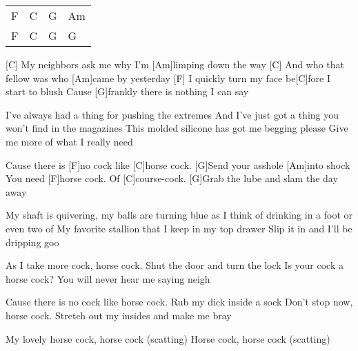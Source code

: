 

\begin{guitar}
	{\footnotesize\begin{tabular}{l|l|l|l}
			F & C & G & Am \\
			F & C & G & G 
	\end{tabular}}
	
	[C] My neighbors ask me why I'm [Am]limping down the way
	[C] And who that fellow was who [Am]came by yesterday
	[F] I quickly turn my face be[C]fore I start to blush
	Cause [G]frankly there is nothing I can say
	
	I've always had a thing for pushing the extremes
	And I've just got a thing you won't find in the magazines
	This molded silicone has got me begging please
	Give me more of what I really need
	
	Cause there is [F]no cock like [C]horse cock. [G]Send your asshole [Am]into shock
	You need [F]horse cock. Of [C]course-cock. [G]Grab the lube and slam the day away
	
	My shaft is quivering, my balls are turning blue as
	I think of drinking in a foot or even two of
	My favorite stallion that I keep in my top drawer
	Slip it in and I'll be dripping goo
	
	As I take more cock, horse cock. Shut the door and turn the lock
	Is your cock a horse cock? You will never hear me saying neigh
	
	Cause there is no cock like horse cock. Rub my dick inside a sock
	Don't stop now, horse cock. Stretch out my insides and make me bray
	
	My lovely horse cock, horse cock (scatting)
	Horse cock, horse cock (scatting)
\end{guitar}